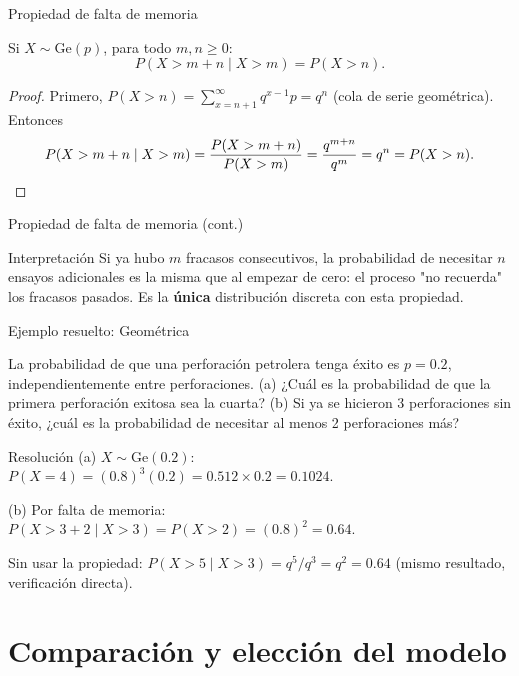 \documentclass[aspectratio=169,11pt]{beamer}
\begin{document}
\begin{frame}{Propiedad de falta de memoria}
\begin{theorem}
Si $X\sim\text{Ge}(p)$, para todo $m,n\ge 0$:
$$P(X>m+n \mid X>m) = P(X>n).$$
\end{theorem}

\begin{proof}
Primero, $P(X>n) = \sum_{x=n+1}^\infty q^{x-1}p = q^n$ (cola de serie geométrica). Entonces
$$P(X>m+n\mid X>m) = \frac{P(X>m+n)}{P(X>m)} = \frac{q^{m+n}}{q^m} = q^n = P(X>n). \qedhere$$
\end{proof}
\end{frame}

\begin{frame}{Propiedad de falta de memoria (cont.)}
\begin{alertblock}{Interpretación}
Si ya hubo $m$ fracasos consecutivos, la probabilidad de necesitar $n$ ensayos adicionales es la misma que al empezar de cero: el proceso "no recuerda" los fracasos pasados. Es la \textbf{única} distribución discreta con esta propiedad.
\end{alertblock}
\end{frame}

\begin{frame}{Ejemplo resuelto: Geométrica}
\begin{example}
La probabilidad de que una perforación petrolera tenga éxito es $p=0.2$, independientemente entre perforaciones. (a) ¿Cuál es la probabilidad de que la primera perforación exitosa sea la cuarta? (b) Si ya se hicieron 3 perforaciones sin éxito, ¿cuál es la probabilidad de necesitar al menos 2 perforaciones más?
\end{example}

\begin{block}{Resolución}
(a) $X\sim\text{Ge}(0.2)$: $P(X=4) = (0.8)^3(0.2) = 0.512\times 0.2 = 0.1024$.

(b) Por falta de memoria: $P(X>3+2 \mid X>3) = P(X>2) = (0.8)^2 = 0.64$.

Sin usar la propiedad: $P(X>5\mid X>3) = q^5/q^3 = q^2 = 0.64$ (mismo resultado, verificación directa).
\end{block}
\end{frame}

\section{Comparación y elección del modelo}
\end{document}
